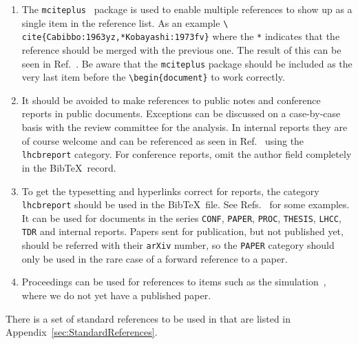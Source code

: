 \begin{enumerate}

\item The \texttt{mciteplus}~\cite{mciteplus} package is used
  to enable multiple references to show up as a single item in the
  reference list. As an example \texttt{\textbackslash
    cite\{Cabibbo:1963yz,*Kobayashi:1973fv\}} where the \texttt{*}
  indicates that the reference should be merged with the previous
  one. The result of this can be seen in
  Ref.~\cite{Cabibbo:1963yz,*Kobayashi:1973fv}. Be aware that the
  \texttt{mciteplus} package should be included as the very last item
  before the \texttt{\textbackslash begin\{document\}} to work
  correctly.

\item It should be avoided to make references to public notes and
  conference reports in public documents. Exceptions can be discussed
  on a case-by-case basis with the review committee for the
  analysis. In internal reports they are of course welcome and can be
  referenced as seen in Ref.~\cite{LHCb-CONF-2012-013} using the
  \texttt{lhcbreport} category. For conference reports, omit the
  author field completely in the Bib\TeX\ record.

\item To get the typesetting and hyperlinks correct for \lhcb reports,
  the category \texttt{lhcbreport} should be used in the Bib\TeX\
  file. See Refs.~\cite{LHCb-INT-2011-047, *LHCb-ANA-2011-078,
    *CERN-THESIS-2014-057, *LHCb-PROC-2014-017, *LHCb-TALK-2014-257}
  for some examples. It can be used for \lhcb documents in the series
  \texttt{CONF}, \texttt{PAPER}, \texttt{PROC}, \texttt{THESIS},
  \texttt{LHCC}, \texttt{TDR} and internal \lhcb reports. Papers sent
  for publication, but not published yet, should be referred with
  their \texttt{arXiv} number, so the \texttt{PAPER} category should
  only be used in the rare case of a forward reference to a paper.

\item Proceedings can be used for references to items such as the
  \lhcb simulation~\cite{LHCb-PROC-2011-006}, where we do not yet have
  a published paper.

\end{enumerate}

There is a set of standard references to be used in \lhcb that are
listed in Appendix~\ref{sec:StandardReferences}.
